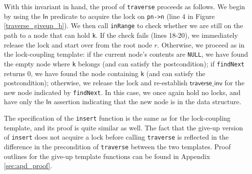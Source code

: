 \documentclass[sigplan,screen]{acmart}
\newcommand{\inFP}{\ensuremath{\mathsf{In }}}
\begin{document}
With this invariant in hand, the proof of \texttt{traverse} proceeds as follows. We begin by using the $\inFP$ predicate to acquire the lock on \lstinline{pn->n} (line 4 in Figure \ref{traverse_giveup_b}). We then call \lstinline{inRange} to check whether we are still on the path to a node that can hold \lstinline{k}. If the check fails (lines 18-20), we immediately release the lock and start over from the root node $r$. Otherwise, we proceed as in the lock-coupling template: if the current node's contents are \texttt{NULL}, we have found the empty node where \texttt{k} belongs (and can satisfy the postcondition); if \texttt{findNext} returns 0, we have found the node containing \texttt{k} (and can satisfy the postcondition); otherwise, we release the lock and re-establish $\mathsf{traverse\_inv}$ for the new node indicated by \texttt{findNext}. In this case, we once again hold no locks, and have only the $\inFP$ assertion indicating that the new node is in the data structure. %


The specification of the \lstinline{insert} function is the same as for the lock-coupling template, and its proof is quite similar as well. The fact that the give-up version of \lstinline{insert} does not acquire a lock before calling \lstinline{traverse} is reflected in the difference in the precondition of \lstinline{traverse} between the two templates. Proof outlines for the give-up template functions can be found in Appendix \ref{sec:apd_proof}.
\end{document}
